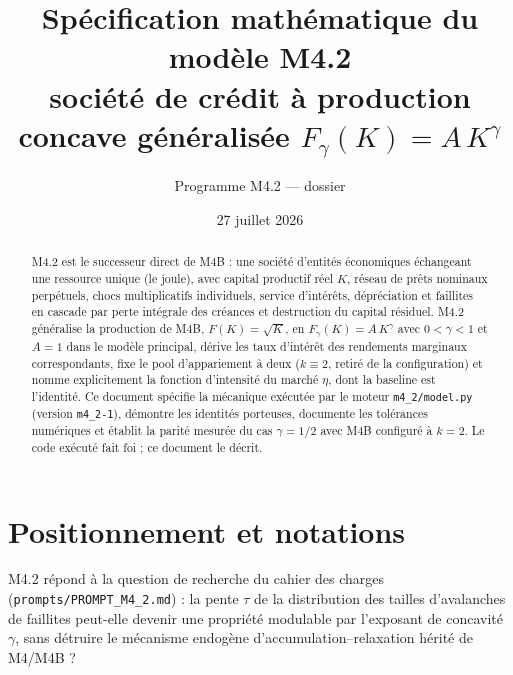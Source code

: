 \documentclass[11pt,a4paper]{article}
\title{Spécification mathématique du modèle M4.2\\
\large société de crédit à production concave généralisée $F_\gamma(K)=A\,K^\gamma$}
\author{Programme M4.2 --- dossier \code{m4\_2\_credit\_soc}}
\date{27 juillet 2026}
\newcommand{\code}[1]{\texttt{#1}}
\begin{document}
\maketitle

\begin{abstract}
M4.2 est le successeur direct de M4B : une société d'entités économiques
échangeant une ressource unique (le joule), avec capital productif réel $K$,
réseau de prêts nominaux perpétuels, chocs multiplicatifs individuels,
service d'intérêts, dépréciation et faillites en cascade par perte intégrale
des créances et destruction du capital résiduel. M4.2 généralise la
production de M4B, $F(K)=\sqrt{K}$, en $F_\gamma(K)=A\,K^\gamma$ avec
$0<\gamma<1$ et $A=1$ dans le modèle principal, dérive les taux d'intérêt
des rendements marginaux correspondants, fixe le pool d'appariement à deux
($k\equiv2$, retiré de la configuration) et nomme explicitement la fonction
d'intensité du marché $\eta$, dont la baseline est l'identité. Ce document
spécifie la mécanique exécutée par le moteur \code{m4\_2/model.py}
(version \code{m4\_2-1}), démontre les identités porteuses, documente les
tolérances numériques et établit la parité mesurée du cas $\gamma=1/2$ avec
M4B configuré à $k=2$. Le code exécuté fait foi ; ce document le décrit.
\end{abstract}

\tableofcontents

\section{Positionnement et notations}

M4.2 répond à la question de recherche du cahier des charges
(\code{prompts/PROMPT\_M4\_2.md}) : la pente $\tau$ de la distribution des
tailles d'avalanches de faillites peut-elle devenir une propriété modulable
par l'exposant de concavité $\gamma$, sans détruire le mécanisme endogène
d'accumulation--relaxation hérité de M4/M4B ?
\end{document}

